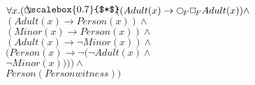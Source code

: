 \documentclass[a4paper,10pt]{article}
\begin{document}
 \newcommand{\nxt}{{\ensuremath\raisebox{0.25ex}{\text{\scriptsize$\bigcirc$}}}}
\newcommand{\Rdiamond}{\Diamond_{\!F}}
\newcommand{\Rbox}{\Box_{\!F}}
\newcommand{\Rnext}{\nxt_{\!F}}
\newcommand{\Ldiamond}{\Diamond_{\!P}}
\newcommand{\Lbox}{\Box_{\!P}}
\newcommand{\Lnext}{\nxt_{\!P}}
\newcommand{\SVdiamond}{\mathop{\ooalign{$\Diamond$ \cr \kern0.5ex
    \raisebox{0.35ex}{\scalebox{0.7}{$*$}}} \kern-0.9ex}}
\newcommand{\SVbox}{\mathop{\ooalign{$\Box$ \cr \kern0.42ex
    \raisebox{0.3ex}{\scalebox{0.7}{$*$}}} \kern-0.9ex}}


$ \forall x. ( \SVbox ((Adult(x) \rightarrow  \Rnext  \Rbox Adult(x)) \land $ \\ 
 $ (Adult(x) \rightarrow Person(x)) \land $ \\ 
 $ (Minor(x) \rightarrow Person(x)) \land $ \\ 
 $ (Adult(x) \rightarrow  \lnot Minor(x)) \land $ \\ 
 $ (Person(x) \rightarrow  \lnot ( \lnot Adult(x) \land $ \\ 
 $  \lnot Minor(x)))) \land $ \\ 
 $ Person(Personwitness))$ 
\end{document}
